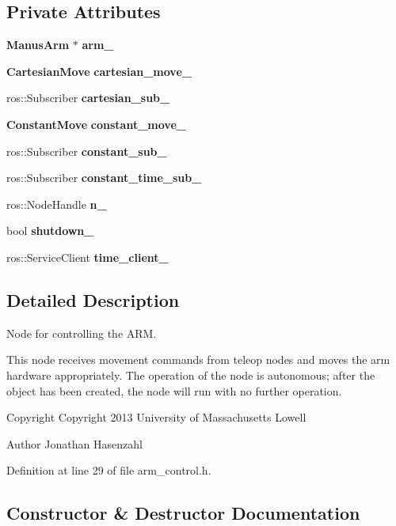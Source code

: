 \subsection*{\-Private \-Attributes}
\begin{DoxyCompactItemize}
\item 
{\bf \-Manus\-Arm} $\ast$ {\bf arm\-\_\-}
\item 
{\bf \-Cartesian\-Move} {\bf cartesian\-\_\-move\-\_\-}
\item 
ros\-::\-Subscriber {\bf cartesian\-\_\-sub\-\_\-}
\item 
{\bf \-Constant\-Move} {\bf constant\-\_\-move\-\_\-}
\item 
ros\-::\-Subscriber {\bf constant\-\_\-sub\-\_\-}
\item 
ros\-::\-Subscriber {\bf constant\-\_\-time\-\_\-sub\-\_\-}
\item 
ros\-::\-Node\-Handle {\bf n\-\_\-}
\item 
bool {\bf shutdown\-\_\-}
\item 
ros\-::\-Service\-Client {\bf time\-\_\-client\-\_\-}
\end{DoxyCompactItemize}


\subsection{\-Detailed \-Description}
\-Node for controlling the \-A\-R\-M. 

\-This node receives movement commands from teleop nodes and moves the arm hardware appropriately. \-The operation of the node is autonomous; after the object has been created, the node will run with no further operation.

\begin{DoxyCopyright}{\-Copyright}
\-Copyright 2013 \-University of \-Massachusetts \-Lowell 
\end{DoxyCopyright}
\begin{DoxyAuthor}{\-Author}
\-Jonathan \-Hasenzahl 
\end{DoxyAuthor}


\-Definition at line 29 of file arm\-\_\-control.\-h.



\subsection{\-Constructor \& \-Destructor \-Documentation}
